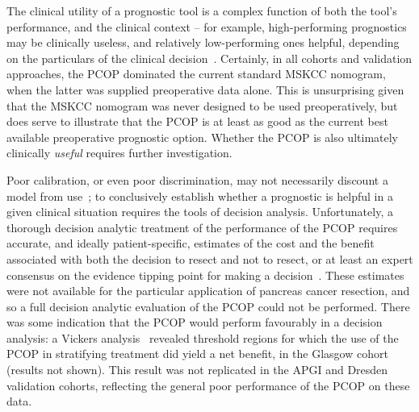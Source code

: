 \documentclass[dissertation.tex]{subfiles}
\begin{document}
The clinical utility of a prognostic tool is a complex function of both the tool's performance, and the clinical context -- for example, high-performing prognostics may be clinically useless, and relatively low-performing ones helpful, depending on the particulars of the clinical decision~\cite{Vickers2010}.  Certainly, in all cohorts and validation approaches, the \gls{PCOP} dominated the current standard \gls{MSKCC} nomogram, when the latter was supplied preoperative data alone.  This is unsurprising given that the \gls{MSKCC} nomogram was never designed to be used preoperatively, but does serve to illustrate that the \gls{PCOP} is at least as good as the current best available preoperative prognostic option.  Whether the \gls{PCOP} is also ultimately clinically \emph{useful} requires further investigation.

Poor calibration, or even poor discrimination, may not necessarily discount a model from use~\cite{Steyerberg2010}; to conclusively establish whether a prognostic is helpful in a given clinical situation requires the tools of decision analysis.  Unfortunately, a thorough decision analytic treatment of the performance of the \gls{PCOP} requires accurate, and ideally patient-specific, estimates of the cost and the benefit associated with both the decision to resect and not to resect, or at least an expert consensus on the evidence tipping point for making a decision~\cite{Vickers2008}.  These estimates were not available for the particular application of pancreas cancer resection, and so a full decision analytic evaluation of the \gls{PCOP} could not be performed.  There was some indication that the \gls{PCOP} would perform favourably in a decision analysis: a Vickers analysis~\cite{Vickers2008} revealed threshold regions for which the use of the \gls{PCOP} in stratifying treatment did yield a net benefit, in the Glasgow cohort (results not shown).  This result was not replicated in the \gls{APGI} and Dresden validation cohorts, reflecting the general poor performance of the \gls{PCOP} on these data.
\end{document}
